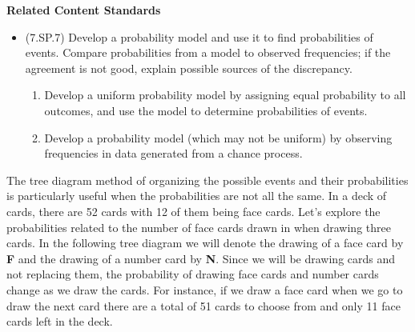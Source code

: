 \documentclass[
]{book}
\providecommand{\tightlist}{%
  \setlength{\itemsep}{0pt}\setlength{\parskip}{0pt}}
\newenvironment{standards}{}{}
\theoremstyle{definition}
\theoremstyle{definition}
\theoremstyle{definition}
\theoremstyle{definition}
\theoremstyle{remark}
\begin{document}
\begin{standards}

\begin{center}
\textbf{Related Content Standards}

\end{center}

\begin{itemize}
\tightlist
\item
  (7.SP.7) Develop a probability model and use it to find probabilities of events. Compare probabilities from a model to observed frequencies; if the agreement is not good, explain possible sources of the discrepancy.

  \begin{enumerate}
  \def\labelenumi{\alph{enumi}.}
  \tightlist
  \item
    Develop a uniform probability model by assigning equal probability to all outcomes, and use the model to determine probabilities of events.
  \item
    Develop a probability model (which may not be uniform) by observing frequencies in data generated from a chance process.
  \end{enumerate}
\end{itemize}

\end{standards}

The tree diagram method of organizing the possible events and their probabilities is particularly useful when the probabilities are not all the same. In a deck of cards, there are 52 cards with 12 of them being face cards. Let's explore the probabilities related to the number of face cards drawn in when drawing three cards. In the following tree diagram we will denote the drawing of a face card by \textbf{F} and the drawing of a number card by \textbf{N}. Since we will be drawing cards and not replacing them, the probability of drawing face cards and number cards change as we draw the cards. For instance, if we draw a face card when we go to draw the next card there are a total of 51 cards to choose from and only 11 face cards left in the deck.
\end{document}
